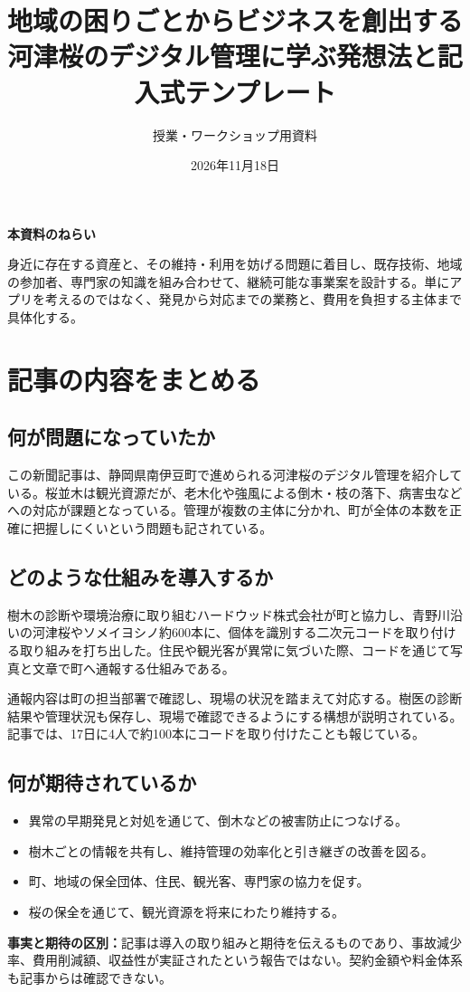 \documentclass[a4paper,11pt]{ltjsarticle}
\title{地域の困りごとからビジネスを創出する\\\large 河津桜のデジタル管理に学ぶ発想法と記入式テンプレート}
\author{授業・ワークショップ用資料}
\date{2026年11月18日}
\newcommand{\lead}[1]{\noindent\textcolor{accent}{\textbf{#1}}\par}
\begin{document}
\maketitle
\lead{本資料のねらい}
身近に存在する資産と、その維持・利用を妨げる問題に着目し、既存技術、地域の参加者、専門家の知識を組み合わせて、継続可能な事業案を設計する。単にアプリを考えるのではなく、発見から対応までの業務と、費用を負担する主体まで具体化する。

\section{記事の内容をまとめる}
\subsection{何が問題になっていたか}
この新聞記事は、静岡県南伊豆町で進められる河津桜のデジタル管理を紹介している。桜並木は観光資源だが、老木化や強風による倒木・枝の落下、病害虫などへの対応が課題となっている。管理が複数の主体に分かれ、町が全体の本数を正確に把握しにくいという問題も記されている。

\subsection{どのような仕組みを導入するか}
樹木の診断や環境治療に取り組むハードウッド株式会社が町と協力し、青野川沿いの河津桜やソメイヨシノ約600本に、個体を識別する二次元コードを取り付ける取り組みを打ち出した。住民や観光客が異常に気づいた際、コードを通じて写真と文章で町へ通報する仕組みである。

通報内容は町の担当部署で確認し、現場の状況を踏まえて対応する。樹医の診断結果や管理状況も保存し、現場で確認できるようにする構想が説明されている。記事では、17日に4人で約100本にコードを取り付けたことも報じている。

\subsection{何が期待されているか}
\begin{itemize}
\item 異常の早期発見と対処を通じて、倒木などの被害防止につなげる。
\item 樹木ごとの情報を共有し、維持管理の効率化と引き継ぎの改善を図る。
\item 町、地域の保全団体、住民、観光客、専門家の協力を促す。
\item 桜の保全を通じて、観光資源を将来にわたり維持する。
\end{itemize}
\textbf{事実と期待の区別：}記事は導入の取り組みと期待を伝えるものであり、事故減少率、費用削減額、収益性が実証されたという報告ではない。契約金額や料金体系も記事からは確認できない。
\end{document}
